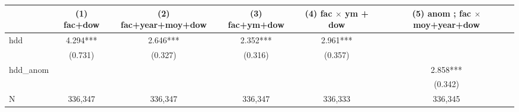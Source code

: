 \begin{tabular}{lccccc}
\hline
 & (1) fac+dow & (2) fac+year+moy+dow & (3) fac+ym+dow & (4) fac $\times$ ym + dow & (5) anom ; fac $\times$ moy+year+dow \\
\hline
hdd & 4.294*** & 2.646*** & 2.352*** & 2.961*** &  \\
 & (0.731) & (0.327) & (0.316) & (0.357) &  \\
hdd\_anom &  &  &  &  & 2.858*** \\
 &  &  &  &  & (0.342) \\
\hline
N & 336,347 & 336,347 & 336,347 & 336,333 & 336,345 \\
\hline
\end{tabular}
